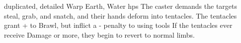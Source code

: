   {duplicated, detailed}%
  {Warp}%
  {Earth, Water}%
  {\glspl{hp}}%
  {The caster demands the targets steal, grab, and snatch, and their hands deform into  tentacles.
  The tentacles grant + to Brawl, but inflict a - penalty to using tools}%
  {
  If the tentacles ever receive  Damage or more, they begin to revert to normal limbs.}
